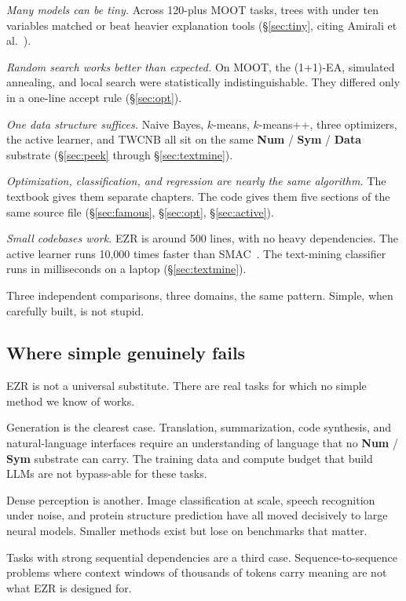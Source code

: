 \documentclass[AMA,STIX2COL]{WileyNJDv5}
\newcommand{\IT}{{\sffamily EZR}}
\newcommand{\cls}[1]{%
  \setlength{\fboxsep}{1.5pt}%
  \colorbox{clsbg}{\sffamily\bfseries{#1}}%
}
\begin{document}
\textit{Many models can be tiny.} Across 120-plus MOOT tasks,
trees with under ten variables matched or beat heavier
explanation tools (\S\ref{sec:tiny}, citing Amirali et
al.~\cite{amirali}).

\textit{Random search works better than expected.} On MOOT, the
(1+1)-EA, simulated annealing, and local search were
statistically indistinguishable. They differed only in a one-line
accept rule (\S\ref{sec:opt}).

\textit{One data structure suffices.} Naive Bayes, $k$-means,
$k$-means++, three optimizers, the active learner, and TWCNB all
sit on the same \cls{Num}/\cls{Sym}/\cls{Data} substrate
(\S\ref{sec:peek} through \S\ref{sec:textmine}).

\textit{Optimization, classification, and regression are nearly
the same algorithm.} The textbook gives them separate chapters.
The code gives them five sections of the same source file
(\S\ref{sec:famous}, \S\ref{sec:opt}, \S\ref{sec:active}).

\textit{Small codebases work.} \IT{} is around 500 lines, with
no heavy dependencies. The active learner runs 10{,}000 times
faster than SMAC~\cite{kashin}. The text-mining classifier runs
in milliseconds on a laptop (\S\ref{sec:textmine}).

Three independent comparisons, three domains, the same pattern.
Simple, when carefully built, is not stupid.

\subsection{Where simple genuinely fails}

\IT{} is not a universal substitute. There are real tasks for
which no simple method we know of works.

Generation is the clearest case. Translation, summarization,
code synthesis, and natural-language interfaces require an
understanding of language that no \cls{Num}/\cls{Sym} substrate
can carry. The training data and compute budget that build LLMs
are not bypass-able for these tasks.

Dense perception is another. Image classification at scale,
speech recognition under noise, and protein structure prediction
have all moved decisively to large neural models. Smaller
methods exist but lose on benchmarks that matter.

Tasks with strong sequential dependencies are a third case.
Sequence-to-sequence problems where context windows of thousands
of tokens carry meaning are not what \IT{} is designed for.
\end{document}
